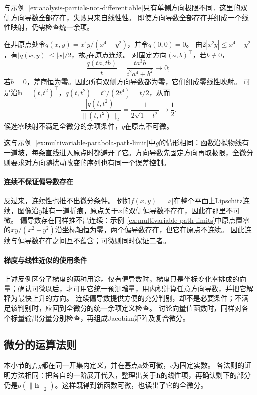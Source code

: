 与示例~\ref{ex:analysis-partials-not-differentiable}只有单侧方向极限不同，这里的双侧方向导数全部存在，失败只来自线性性。
即使方向导数全部存在并组成一个线性映射，仍需检查统一余项。
\begin{example}[方向导数全为零仍不可微]
\label{ex:multivariable-linear-directionals-not-differentiable}
在非原点处令$q(x,y)=x^3y/(x^4+y^2)$，并令$q(0,0)=0$。
由$2|x^2y|\leq x^4+y^2$，有$|q(x,y)|\leq|x|/2$，故$q$在原点连续。
对固定方向$(a,b)^\top$，若$b\neq0$，
\[
 \frac{q(ta,tb)}t=\frac{t a^3b}{t^2a^4+b^2}\longrightarrow0;
\]
若$b=0$，差商恒为零。因此所有双侧方向导数都为零，它们组成零线性映射。
可是沿$\bm h=(t,t^2)^\top$，$q(t,t^2)=t^5/(2t^4)=t/2$，从而
\[
 \frac{|q(t,t^2)|}{\lVert(t,t^2)\rVert_2}
 =\frac1{2\sqrt{1+t^2}}\longrightarrow\frac12.
\]
候选零映射不满足全微分的余项条件，$q$在原点不可微。
\end{example}

这与示例~\ref{ex:multivariable-parabola-path-limit}中$g$的情形相同：函数沿抛物线有一道坡，每条直线进入原点时都避开了它。方向导数先固定方向再取极限，全微分则要求对方向随扰动改变的序列也有同一个误差控制。

\paragraph{连续不保证偏导数存在}
反过来，连续性也推不出微分条件。
例如$f(x,y)=|x|$在整个平面上Lipschitz连续，图像沿$y$轴有一道折痕，原点关于$x$的双侧偏导数不存在，因此在那里不可微。
偏导数存在同样推不出连续：示例~\ref{ex:multivariable-path-limits}中原点置零的$xy/(x^2+y^2)$沿坐标轴恒为零，两个偏导数存在，但它在原点不连续。
因此连续与偏导数存在之间互不蕴含；可微则同时保证二者。

\paragraph{梯度与线性近似的使用条件}
上述反例区分了梯度的两种用途。仅有偏导数时，梯度只是坐标变化率排成的向量；确认可微以后，才可用它统一预测增量，用内积计算任意方向导数，并把它解释为最快上升的方向。
连续偏导数提供方便的充分判别，却不是必要条件；不满足该判别时，应回到全微分的统一余项定义检查。
讨论向量值函数时，同样对各个标量输出分量分别检查，再组成Jacobian矩阵及复合微分。

\subsection{微分的运算法则}

本小节的$f,g$都在同一开集内定义，并在基点$\bm a$处可微，$c$为固定实数。
各法则的证明方法相同：把各自的一阶展开代入，整理出关于$\bm h$的线性项，再确认剩下的部分仍是$o(\lVert\bm h\rVert_2)$。这样既得到新函数可微，也读出了它的全微分。

